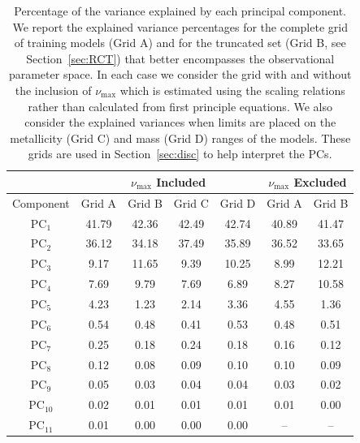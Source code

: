 \begin{table}
\centering
\caption{Percentage of the variance explained by each principal component. We report the explained variance percentages for the complete grid of training models (Grid A) and for the truncated set (Grid B, see Section~\ref{sec:RCT}) that better encompasses the observational parameter space. In each case we consider the grid with and without the inclusion of $\nu_{\max}$ which is estimated using the \citet{1995A&A...293...87K} scaling relations rather than calculated from first principle equations. We also consider the explained variances when limits are placed on the metallicity (Grid C) and mass (Grid D) ranges of the models.  These grids are used in Section~\ref{sec:disc} to help interpret the PCs. \label{tab:PCAEV}} 

\begin{tabular}{c|cccc|cc}
        \multicolumn{1}{c}{}  &
        \multicolumn{4}{c|}{$\nu_{\max}$ Included}               &
        \multicolumn{2}{c}{$\nu_{\max}$ Excluded}\\\hline
        Component  &
        Grid A &
        Grid B &
        Grid C &
        Grid D &
        Grid A &
        Grid B \\\hline
PC$_1$ 	&	41.79	&	42.36	& 42.49 & 42.74 &	40.89	&	41.47	\\
PC$_2$ 	&	36.12	&	34.18	& 37.49 & 35.89 &	36.52	&	33.65	\\
PC$_3$	&	9.17	&	11.65	& 9.39  & 10.25 &	8.99	&	12.21	\\
PC$_4$	&	7.69	&	9.79	& 7.69  &  6.89 &	8.27	&	10.58	\\
PC$_5$ 	&	4.23	&	1.23	& 2.14  &  3.36 &	4.55	&	1.36	\\
PC$_6$	&	0.54	&	0.48	&0.41    & 0.53   &	0.48	&	0.51	\\
PC$_7$	&	0.25	&	0.18	&0.24    &0.18    &	0.16	&	0.12	\\
PC$_8$ 	&	0.12	&	0.08	&0.09    &0.10    &	0.10	&	0.09	\\
PC$_9$	&	0.05	&	0.03	&0.04    &0.04    &	0.03	&	0.02	\\
PC$_{10}$ 	&	0.02	&	0.01 &0.01   &0.01	&	0.01	&	0.00	\\
PC$_{11}$	&	0.01	&	0.00 &0.00   &0.00     &	--	    &	--	
\end{tabular}
\end{table}

